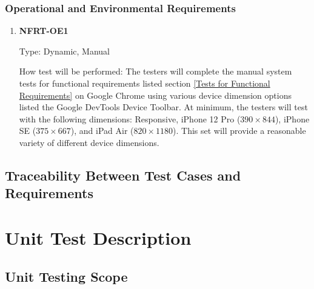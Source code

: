\documentclass[12pt, titlepage]{article}
\begin{document}
\subsubsection{Operational and Environmental Requirements}
\begin{enumerate}

	\item \textbf{NFRT-OE1} %

	      Type: Dynamic, Manual

	      How test will be performed: The testers will complete the manual system tests for functional
	      requirements listed section \ref{Tests for Functional Requirements} on Google Chrome using various
	      device dimension options listed the Google DevTools Device Toolbar. At minimum, the testers will
	      test with the following dimensions: Responsive, iPhone 12 Pro ($390 \times 844$), iPhone SE ($375
		      \times 667$), and iPad Air ($820 \times 1180$). This set will provide a reasonable variety of
	      different device dimensions.

\end{enumerate}

\subsection{Traceability Between Test Cases and Requirements}


\section{Unit Test Description} \label{Unit Test Description}


\subsection{Unit Testing Scope}

\end{document}
